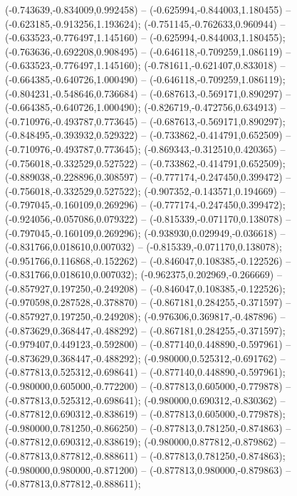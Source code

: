  (-0.743639,-0.834009,0.992458) -- (-0.625994,-0.844003,1.180455) -- (-0.623185,-0.913256,1.193624);
 (-0.751145,-0.762633,0.960944) -- (-0.633523,-0.776497,1.145160) -- (-0.625994,-0.844003,1.180455);
 (-0.763636,-0.692208,0.908495) -- (-0.646118,-0.709259,1.086119) -- (-0.633523,-0.776497,1.145160);
 (-0.781611,-0.621407,0.833018) -- (-0.664385,-0.640726,1.000490) -- (-0.646118,-0.709259,1.086119);
 (-0.804231,-0.548646,0.736684) -- (-0.687613,-0.569171,0.890297) -- (-0.664385,-0.640726,1.000490);
 (-0.826719,-0.472756,0.634913) -- (-0.710976,-0.493787,0.773645) -- (-0.687613,-0.569171,0.890297);
 (-0.848495,-0.393932,0.529322) -- (-0.733862,-0.414791,0.652509) -- (-0.710976,-0.493787,0.773645);
 (-0.869343,-0.312510,0.420365) -- (-0.756018,-0.332529,0.527522) -- (-0.733862,-0.414791,0.652509);
 (-0.889038,-0.228896,0.308597) -- (-0.777174,-0.247450,0.399472) -- (-0.756018,-0.332529,0.527522);
 (-0.907352,-0.143571,0.194669) -- (-0.797045,-0.160109,0.269296) -- (-0.777174,-0.247450,0.399472);
 (-0.924056,-0.057086,0.079322) -- (-0.815339,-0.071170,0.138078) -- (-0.797045,-0.160109,0.269296);
 (-0.938930,0.029949,-0.036618) -- (-0.831766,0.018610,0.007032) -- (-0.815339,-0.071170,0.138078);
 (-0.951766,0.116868,-0.152262) -- (-0.846047,0.108385,-0.122526) -- (-0.831766,0.018610,0.007032);
 (-0.962375,0.202969,-0.266669) -- (-0.857927,0.197250,-0.249208) -- (-0.846047,0.108385,-0.122526);
 (-0.970598,0.287528,-0.378870) -- (-0.867181,0.284255,-0.371597) -- (-0.857927,0.197250,-0.249208);
 (-0.976306,0.369817,-0.487896) -- (-0.873629,0.368447,-0.488292) -- (-0.867181,0.284255,-0.371597);
 (-0.979407,0.449123,-0.592800) -- (-0.877140,0.448890,-0.597961) -- (-0.873629,0.368447,-0.488292);
 (-0.980000,0.525312,-0.691762) -- (-0.877813,0.525312,-0.698641) -- (-0.877140,0.448890,-0.597961);
 (-0.980000,0.605000,-0.772200) -- (-0.877813,0.605000,-0.779878) -- (-0.877813,0.525312,-0.698641);
 (-0.980000,0.690312,-0.830362) -- (-0.877812,0.690312,-0.838619) -- (-0.877813,0.605000,-0.779878);
 (-0.980000,0.781250,-0.866250) -- (-0.877813,0.781250,-0.874863) -- (-0.877812,0.690312,-0.838619);
 (-0.980000,0.877812,-0.879862) -- (-0.877813,0.877812,-0.888611) -- (-0.877813,0.781250,-0.874863);
 (-0.980000,0.980000,-0.871200) -- (-0.877813,0.980000,-0.879863) -- (-0.877813,0.877812,-0.888611);
